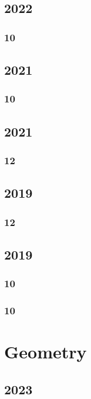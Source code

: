 \documentclass[11pt]{book}
\begin{document}
\section{2022}
\subsection{10}

\section{2021}
\subsection{10}



\section{2021}
\subsection{12}


\section{2019}
\subsection{12}


\section{2019} 
\subsection{10}

\subsection{10}




\chapter{Geometry}
\section{2023}
\end{document}
